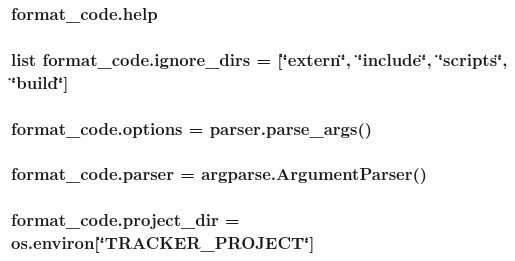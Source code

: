 \subsubsection[{\texorpdfstring{help}{help}}]{\setlength{\rightskip}{0pt plus 5cm}format\+\_\+code.\+help}\hypertarget{namespaceformat__code_abb33d640082c99fb15f9b734df4b4e7f}{}\label{namespaceformat__code_abb33d640082c99fb15f9b734df4b4e7f}
\subsubsection[{\texorpdfstring{ignore\+\_\+dirs}{ignore_dirs}}]{\setlength{\rightskip}{0pt plus 5cm}list format\+\_\+code.\+ignore\+\_\+dirs = \mbox{[}\char`\"{}extern\char`\"{}, \char`\"{}include\char`\"{}, \char`\"{}scripts\char`\"{}, \char`\"{}build\char`\"{}\mbox{]}}\hypertarget{namespaceformat__code_a98a7b6be250f74d3192ddcaf0e71dc96}{}\label{namespaceformat__code_a98a7b6be250f74d3192ddcaf0e71dc96}
\subsubsection[{\texorpdfstring{options}{options}}]{\setlength{\rightskip}{0pt plus 5cm}format\+\_\+code.\+options = parser.\+parse\+\_\+args()}\hypertarget{namespaceformat__code_a43a94368c31bf207fd1a26e63b307c08}{}\label{namespaceformat__code_a43a94368c31bf207fd1a26e63b307c08}
\subsubsection[{\texorpdfstring{parser}{parser}}]{\setlength{\rightskip}{0pt plus 5cm}format\+\_\+code.\+parser = argparse.\+Argument\+Parser()}\hypertarget{namespaceformat__code_a7f98dd943324417c636055f6fccbbad2}{}\label{namespaceformat__code_a7f98dd943324417c636055f6fccbbad2}
\subsubsection[{\texorpdfstring{project\+\_\+dir}{project_dir}}]{\setlength{\rightskip}{0pt plus 5cm}format\+\_\+code.\+project\+\_\+dir = os.\+environ\mbox{[}\char`\"{}T\+R\+A\+C\+K\+E\+R\+\_\+\+P\+R\+O\+J\+E\+CT\char`\"{}\mbox{]}}\hypertarget{namespaceformat__code_a68ac70ae44b8a44d6bd6287ab8ed3a57}{}\label{namespaceformat__code_a68ac70ae44b8a44d6bd6287ab8ed3a57}
